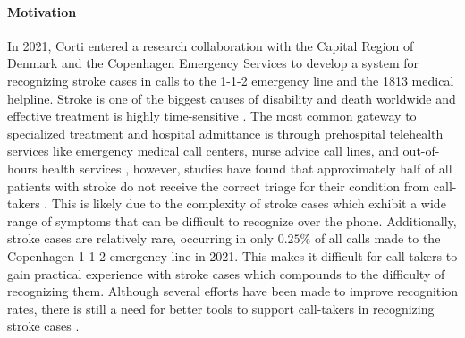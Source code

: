\paragraph{Motivation} In 2021, Corti entered a research collaboration with the Capital Region of Denmark and the Copenhagen Emergency Services to develop a system for recognizing stroke cases in calls to the 1-1-2 emergency line and the 1813 medical helpline. 
Stroke is one of the biggest causes of disability and death worldwide \parencite{cite1,cite2,cite3} and effective treatment is highly time-sensitive \parencite{cite4,cite5}. The most common gateway to specialized treatment and hospital admittance is through prehospital telehealth services like emergency medical call centers, nurse advice call lines, and out-of-hours health services \parencite{cite6,cite7}, however, studies have found that approximately half of all patients with stroke do not receive the correct triage for their condition from call-takers \parencite{cite10,cite11,cite12}. 
This is likely due to the complexity of stroke cases which exhibit a wide range of symptoms that can be difficult to recognize over the phone. Additionally, stroke cases are relatively rare, occurring in only $0.25\%$ of all calls made to the Copenhagen 1-1-2 emergency line in 2021. This makes it difficult for call-takers to gain practical experience with stroke cases which compounds to the difficulty of recognizing them. Although several efforts have been made to improve recognition rates, there is still a need for better tools to support call-takers in recognizing stroke cases \parencite{cite13,cite14,cite15}.

